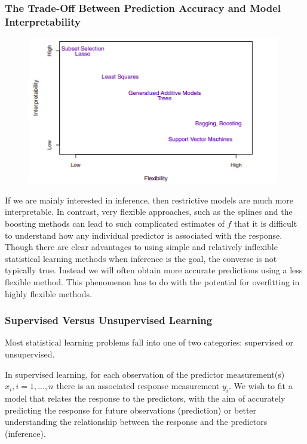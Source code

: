 \documentclass{article}
\begin{document}
\subsubsection{The Trade-Off Between Prediction Accuracy and Model Interpretability}

\begin{figure}[H]
    \centering
    \includegraphics[width=11cm]{isl-figure-1.png}
\end{figure}


If we are mainly interested in inference, then restrictive models are much more interpretable.  In contrast, very flexible approaches, such as the splines and the boosting methods can lead to such complicated estimates of $f$ that it is difficult to understand how any individual predictor is associated with the response. 
Though there are clear advantages to using simple and relatively inflexible statistical learning methods when inference is the goal, the converse is not typically true. Instead we will often obtain more accurate predictions using a less flexible method. This phenomenon has to do with the potential for overfitting in highly flexible
methods.

\subsubsection{Supervised Versus Unsupervised Learning}
Most statistical learning problems fall into one of two categories: supervised or unsupervised.

In supervised learning, for each observation of the
predictor measurement(s) $x_i, i = 1,...,n$ there is an associated response measurement $y_i$. We wish to fit a model that relates the response to the predictors, with the aim of accurately predicting the response for future
observations (prediction) or better understanding the relationship between the response and the predictors (inference).
\end{document}
